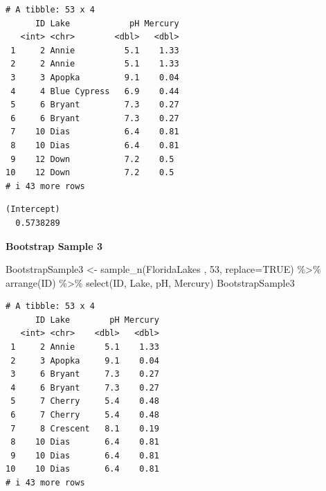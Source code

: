 \documentclass[
  letterpaper,
  DIV=11,
  numbers=noendperiod]{scrreprt}
\newenvironment{Shaded}{\begin{snugshade}}{\end{snugshade}}
\newcommand{\AttributeTok}[1]{\textcolor[rgb]{0.40,0.45,0.13}{#1}}
\newcommand{\CommentTok}[1]{\textcolor[rgb]{0.37,0.37,0.37}{#1}}
\newcommand{\ConstantTok}[1]{\textcolor[rgb]{0.56,0.35,0.01}{#1}}
\newcommand{\DecValTok}[1]{\textcolor[rgb]{0.68,0.00,0.00}{#1}}
\newcommand{\FunctionTok}[1]{\textcolor[rgb]{0.28,0.35,0.67}{#1}}
\newcommand{\NormalTok}[1]{\textcolor[rgb]{0.00,0.23,0.31}{#1}}
\newcommand{\OtherTok}[1]{\textcolor[rgb]{0.00,0.23,0.31}{#1}}
\newcommand{\SpecialCharTok}[1]{\textcolor[rgb]{0.37,0.37,0.37}{#1}}
\begin{document}
\begin{verbatim}
# A tibble: 53 x 4
      ID Lake            pH Mercury
   <int> <chr>        <dbl>   <dbl>
 1     2 Annie          5.1    1.33
 2     2 Annie          5.1    1.33
 3     3 Apopka         9.1    0.04
 4     4 Blue Cypress   6.9    0.44
 5     6 Bryant         7.3    0.27
 6     6 Bryant         7.3    0.27
 7    10 Dias           6.4    0.81
 8    10 Dias           6.4    0.81
 9    12 Down           7.2    0.5 
10    12 Down           7.2    0.5 
# i 43 more rows
\end{verbatim}

\begin{Shaded}
\end{Shaded}

\begin{verbatim}
(Intercept) 
  0.5738289 
\end{verbatim}

\textbf{Bootstrap Sample 3}

\begin{Shaded}
\begin{Highlighting}[]
\NormalTok{BootstrapSample3 }\OtherTok{\textless{}{-}} \FunctionTok{sample\_n}\NormalTok{(FloridaLakes , }\DecValTok{53}\NormalTok{, }\AttributeTok{replace=}\ConstantTok{TRUE}\NormalTok{)  }\SpecialCharTok{\%\textgreater{}\%} \FunctionTok{arrange}\NormalTok{(ID) }\SpecialCharTok{\%\textgreater{}\%} 
  \FunctionTok{select}\NormalTok{(ID, Lake, pH, Mercury)}
\NormalTok{BootstrapSample3}
\end{Highlighting}
\end{Shaded}

\begin{verbatim}
# A tibble: 53 x 4
      ID Lake        pH Mercury
   <int> <chr>    <dbl>   <dbl>
 1     2 Annie      5.1    1.33
 2     3 Apopka     9.1    0.04
 3     6 Bryant     7.3    0.27
 4     6 Bryant     7.3    0.27
 5     7 Cherry     5.4    0.48
 6     7 Cherry     5.4    0.48
 7     8 Crescent   8.1    0.19
 8    10 Dias       6.4    0.81
 9    10 Dias       6.4    0.81
10    10 Dias       6.4    0.81
# i 43 more rows
\end{verbatim}
\end{document}
